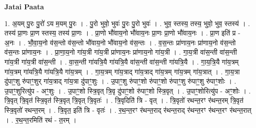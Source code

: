 \documentclass[17pt]{extarticle}
\begin{document}
\textbf{Jatai Paata} \newline

1. अ॒यम् पु॒रः पु॒रो॑ ऽय म॒यम् पु॒रः । . पु॒रो भुवो॒ भुवः॑ पु॒रः पु॒रो भुवः॑ । . भुव॒ स्तस्य॒ तस्य॒ भुवो॒ भुव॒ स्तस्य॑ । . तस्य॑ प्रा॒णः प्रा॒ण स्तस्य॒ तस्य॑ प्रा॒णः । . प्रा॒णो भौ॑वाय॒नो भौ॑वाय॒नः प्रा॒णः प्रा॒णो भौ॑वाय॒नः । . प्रा॒ण इति॑ प्र - अ॒नः । . भौ॒वा॒य॒नो व॑स॒न्तो व॑स॒न्तो भौ॑वाय॒नो भौ॑वाय॒नो व॑स॒न्तः । . व॒स॒न्तः प्रा॑णाय॒नः प्रा॑णाय॒नो व॑स॒न्तो व॑स॒न्तः प्रा॑णाय॒नः । . प्रा॒णा॒य॒नो गा॑य॒त्री गा॑य॒त्री प्रा॑णाय॒नः प्रा॑णाय॒नो गा॑य॒त्री । . गा॒य॒त्री वा॑स॒न्ती वा॑स॒न्ती गा॑य॒त्री गा॑य॒त्री वा॑स॒न्ती । . वा॒स॒न्ती गा॑यत्रि॒यै गा॑यत्रि॒यै वा॑स॒न्ती वा॑स॒न्ती गा॑यत्रि॒यै । . गा॒य॒त्रि॒यै गा॑य॒त्रम् गा॑य॒त्रम् गा॑यत्रि॒यै गा॑यत्रि॒यै गा॑य॒त्रम् । . गा॒य॒त्रम् गा॑य॒त्राद् गा॑य॒त्राद् गा॑य॒त्रम् गा॑य॒त्रम् गा॑य॒त्रात् । . गा॒य॒त्रा दु॑पाꣳ॒॒शु रु॑पाꣳ॒॒शुर् गा॑य॒त्राद् गा॑य॒त्रा दु॑पाꣳ॒॒शुः । . उ॒पाꣳ॒॒शु रु॑पाꣳ॒॒शो रु॑पाꣳ॒॒शो रु॑पाꣳ॒॒शु रु॑पाꣳ॒॒शु रु॑पाꣳ॒॒शोः । . उ॒पाꣳ॒॒शुरित्यु॑प - अꣳ॒॒शुः । . उ॒पाꣳ॒॒शो स्त्रि॒वृत् त्रि॒वृ दु॑पाꣳ॒॒शो रु॑पाꣳ॒॒शो स्त्रि॒वृत् । . उ॒पाꣳ॒॒शोरित्यु॑प - अꣳ॒॒शोः । . त्रि॒वृत् त्रि॒वृत॑ स्त्रि॒वृत॑ स्त्रि॒वृत् त्रि॒वृत् त्रि॒वृतः॑ । . त्रि॒वृदिति॑ त्रि - वृत् । . त्रि॒वृतो॑ रथन्त॒रꣳ र॑थन्त॒रम् त्रि॒वृत॑ स्त्रि॒वृतो॑ रथन्त॒रम् । . त्रि॒वृत॒ इति॑ त्रि - वृतः॑ । . र॒थ॒न्त॒रꣳ र॑थन्त॒राद् र॑थन्त॒राद् र॑थन्त॒रꣳ र॑थन्त॒रꣳ र॑थन्त॒रात् । . र॒थ॒न्त॒रमिति॑ रथं - त॒रम् । \newline
\end{document}

